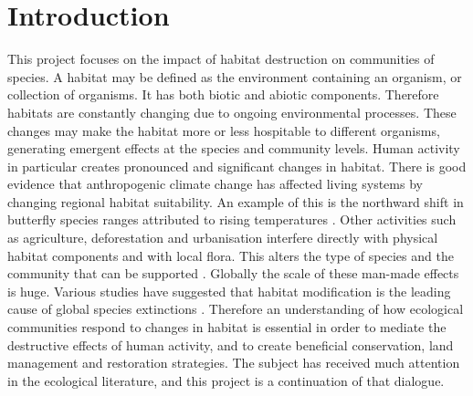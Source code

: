 \documentclass[12pt]{article}
\begin{document}
\maketitle

\newpage
\section{Introduction}


This project focuses on the impact of habitat destruction on communities of species. A habitat may be defined as the environment containing an organism, or collection of organisms. It has both biotic and abiotic components. Therefore habitats are constantly changing due to ongoing environmental processes. These changes may make the habitat more or less hospitable to different organisms, generating emergent effects at the species and community levels. Human activity in particular creates pronounced and significant changes in habitat. There is good evidence \cite{parmesan2003globally} that anthropogenic climate change has affected living systems by changing regional habitat suitability. An example of this is the northward shift in butterfly species ranges attributed to rising temperatures \cite{parmesan1999poleward}. Other activities such as agriculture, deforestation and urbanisation interfere directly with physical habitat components and with local flora. This alters the type of species and the community that can be supported \cite{bossio2005soil, kremen2007pollination}. Globally the scale of these man-made effects is huge. Various studies have suggested that habitat modification is the leading cause of global species extinctions \cite{foley2005global,tylianakis2007habitat}. Therefore an understanding of how ecological communities respond to changes in habitat is essential in order to mediate the destructive effects of human activity, and to create beneficial conservation, land management and restoration strategies. The subject has received much attention in the ecological literature, and this project is a continuation of that dialogue.
\end{document}
